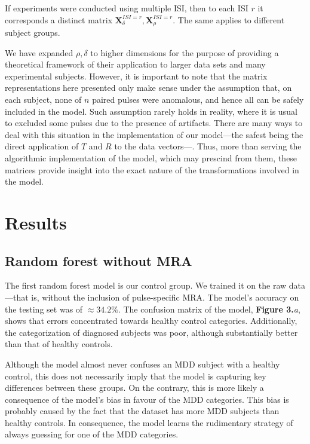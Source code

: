 \documentclass{article}
\begin{document}
\begin{multicols}{2}
If experiments were conducted using multiple ISI, then to each ISI $r$ it
corresponds a distinct matrix $\textbf{X}_\delta^{ISI = r},
\textbf{X}_\rho^{ISI = r}$. The same applies to different subject groups.

We have expanded $\rho, \delta$ to higher dimensions for the purpose of
providing a theoretical framework of their application to larger data sets and
many experimental subjects. However, it is important to note that the matrix
representations here presented only make sense under the assumption that, on
each subject, none of $n$ paired pulses were anomalous, and hence all can be
safely included in the model. Such assumption rarely holds in reality, where it
is usual to excluded some pulses due to the presence of artifacts. There are
many ways to deal with this situation in the implementation of our model---the
safest being the direct application of $T$ and $R$ to the data vectors---. Thus,
more than serving the algorithmic implementation of the model, which may
prescind from them, these matrices provide insight into the exact nature of the
transformations involved in the model.


\section{Results}

\subsection{Random forest without MRA}

The first random forest model is our control group. We trained it on the raw
data ---that is, without the inclusion of pulse-specific MRA. The model's
accuracy on the testing set was of $\approx34.2 \%$. The confusion matrix of the
model, \textbf{Figure 3.}\textit{a}, shows that errors concentrated towards
healthy control categories. Additionally, the categorization of diagnosed
subjects was poor, although substantially better than that of healthy controls. 

Although the model almost never confuses an MDD subject with a healthy control,
this does not necessarily imply that the model is capturing key differences
between these groups. On the contrary, this is more likely a consequence of the
model's bias in favour of the MDD categories. This bias is probably caused by
the fact that the dataset has more MDD subjects than healthy controls. In
consequence, the model learns the rudimentary strategy of always guessing for
one of the MDD categories.


\end{multicols}
\end{document}
